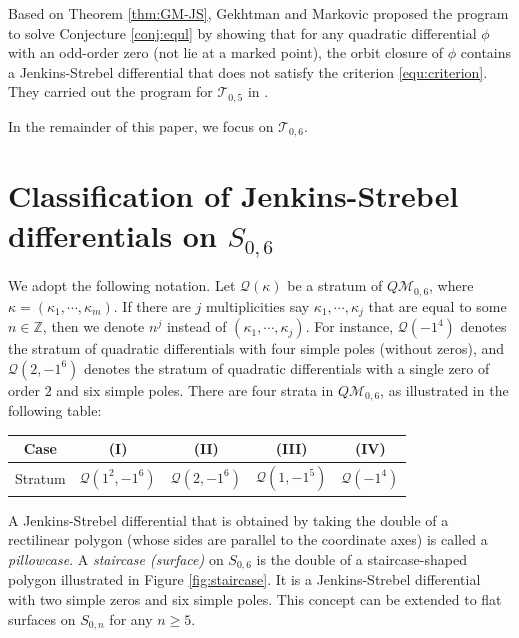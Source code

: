 \documentclass[11pt]{amsart}
\theoremstyle{plain}
\newcommand{\Tei}{\mathcal{T}}
\newcommand{\Q}{\mathcal{Q}}
\begin{document}
Based on Theorem \ref{thm:GM-JS}, Gekhtman and Markovic proposed the program to solve Conjecture \ref{conj:equl} by showing that for any quadratic differential $\phi$ with an odd-order zero (not lie at a marked point), the orbit closure of $\phi$ contains a Jenkins-Strebel differential that does not satisfy the criterion \eqref{equ:criterion}. They carried out the program for $\Tei_{0,5}$ in \cite{GM2020}. 

In the remainder of this paper, we focus on $\Tei_{0,6}$. 







\section{Classification of Jenkins-Strebel differentials on $S_{0,6}$}
\label{sec:classify}


We adopt the following notation. Let  $\mathcal{Q}(\kappa)$ be a stratum of $Q\mathcal{M}_{0,6}$, where $\kappa=(\kappa_1, \cdots, \kappa_m)$.  If there are $j$ multiplicities say $\kappa_{1},\cdots, \kappa_{j}$ that are equal to some $n\in \mathbb{Z}$, then we denote $n^{j}$ instead of $(\kappa_{1},\cdots, \kappa_{j})$. For instance, $\mathcal{Q}(-1^4)$ denotes 
the stratum of quadratic differentials with four simple poles (without zeros),
and $\mathcal{Q}(2, -1^6)$ denotes 
the stratum of quadratic differentials with a single zero of order $2$ 
and six simple poles.
There are four strata in $Q\mathcal{M}_{0,6}$, as illustrated in the following table:

\bigskip

\begin{center}
\begin{tabular}{ |c |c |c| c | c| } 
  \hline
Case & (I) & (II) & (III) & (IV)  \\ 
  \hline
 Stratum &  $\Q(1^2, -1^6)$ & $\Q(2, -1^6)$ & $\Q(1, -1^5)$ & $\Q(-1^4)$ \\ 
  \hline
\end{tabular}
\end{center}

\bigskip

A Jenkins-Strebel differential  that is obtained by taking the double of a rectilinear polygon (whose sides are parallel to the coordinate axes) is called a \emph{pillowcase}. 
A \emph{staircase (surface)} on $S_{0,6}$ is the double of a staircase-shaped polygon  illustrated  in Figure   
\ref{fig:staircase}. It is a Jenkins-Strebel differential with two simple zeros and six simple poles.
This concept can be extended to flat surfaces on $S_{0,n}$ for any $n\geq 5$. 
\end{document}
